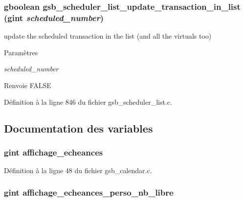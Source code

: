 \subsubsection[{gsb\_\-scheduler\_\-list\_\-update\_\-transaction\_\-in\_\-list}]{\setlength{\rightskip}{0pt plus 5cm}gboolean gsb\_\-scheduler\_\-list\_\-update\_\-transaction\_\-in\_\-list (gint {\em scheduled\_\-number})}\label{gsb__scheduler__list_8c_a7b1d97387d5d2e281f3ead3e6ab0311b}
update the scheduled transaction in the list (and all the virtuals too)


\begin{DoxyParams}{Paramètres}
\item[{\em scheduled\_\-number}]\end{DoxyParams}
\begin{DoxyReturn}{Renvoie}
FALSE 
\end{DoxyReturn}


Définition à la ligne 846 du fichier gsb\_\-scheduler\_\-list.c.



\subsection{Documentation des variables}
\subsubsection[{affichage\_\-echeances}]{\setlength{\rightskip}{0pt plus 5cm}gint {\bf affichage\_\-echeances}}\label{gsb__scheduler__list_8c_ab762c5bee8904fe3e83e8c2dfdecd94d}


Définition à la ligne 48 du fichier gsb\_\-calendar.c.

\subsubsection[{affichage\_\-echeances\_\-perso\_\-nb\_\-libre}]{\setlength{\rightskip}{0pt plus 5cm}gint {\bf affichage\_\-echeances\_\-perso\_\-nb\_\-libre}}\label{gsb__scheduler__list_8c_aa8e493eac3d096f6914e1551552c590a}


